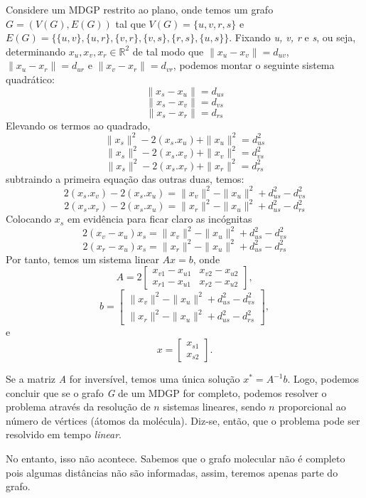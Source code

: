 \documentclass[a4paper,12pt]{article}
\begin{document}
	Considere um MDGP restrito ao plano, onde temos um grafo $G = (V(G), E(G))$ tal que $V(G)=\{u, v, r, s\}$ e $E(G)=\{\{u,v\}, \{u, r\}, \{v, r\}, \{v, s\}, \{r, s\}, \{u, s\}\}$. Fixando \textit{u, v, r} e \textit{s}, ou seja, determinando $ x_{u}, x_{v},x_{r} \in\mathbb{R}^2$ de tal modo que $\|x_{u} - x_{v}\|= d_{uv}$,  $\|x_{u} - x_{r}\|= d_{ur}$ e $\|x_{v} - x_{r}\|= d_{vr}$, podemos montar o  seguinte sistema quadrático:
	$$ \|x_{s} - x_{u}\|= d_{us} $$$$ \|x_{s} - x_{v}\|= d_{vs} $$$$ \|x_{s} - x_{r}\|= d_{rs} $$
	Elevando os termos ao quadrado,
	$$\|x_{s}\|^{2} - 2(x_{s}.x_{u}) + \|x_{u}\|^{2} = d_{us}^{2}$$
	$$\|x_{s}\|^{2} - 2(x_{s}.x_{v}) + \|x_{v}\|^{2} = d_{vs}^{2}$$
	$$\|x_{s}\|^{2} - 2(x_{s}.x_{r}) + \|x_{r}\|^{2} = d_{rs}^{2}$$
	subtraindo a primeira equação das outras duas, temos:
	$$2(x_{s}.x_{v}) - 2(x_{s}.x_{u}) = \|x_{v}\|^{2} - \|x_{u}\|^{2} + d_{us}^{2} - d_{vs}^{2}$$
	$$2(x_{s}.x_{r}) - 2(x_{s}.x_{u}) = \|x_{r}\|^{2} - \|x_{u}\|^{2} + d_{us}^{2} - d_{rs}^{2}$$
	Colocando $x_{s}$ em evidência para ficar claro as incógnitas
	$$2(x_{v} - x_{u})x_{s} = \|x_{v}\|^{2} - \|x_{u}\|^{2} + d_{us}^{2} - d_{vs}^{2}$$
	$$2(x_{r} - x_{u})x_{s} = \|x_{r}\|^{2} - \|x_{u}\|^{2} + d_{us}^{2} - d_{rs}^{2}$$
	Por tanto, temos um sistema linear $Ax = b$, onde
	$$
	A = 2\begin{bmatrix}
	x_{v1} - x_{u1} & x_{v2} - x_{u2}\\
	x_{r1} - x_{u1} & x_{r2} - x_{u2}
	\end{bmatrix},
	$$
	$$
	b = \begin{bmatrix}
	\|x_{v}\|^{2} - \|x_{u}\|^{2} + d_{us}^{2} - d_{vs}^{2}\\
	\|x_{r}\|^{2} - \|x_{u}\|^{2} + d_{us}^{2} - d_{rs}^{2}
	\end{bmatrix},
	$$
	e
	$$
	x = \begin{bmatrix}
	x_{s1}\\
	x_{s2}
	\end{bmatrix}.
	$$
	
	Se a matriz \textit{A} for inversível, temos uma única solução $x^{*} = A^{-1}b$. Logo, podemos concluir que se o grafo \textit{G} de um MDGP for completo, podemos resolver o problema através da resolução de $n$ sistemas lineares, sendo $n$ proporcional ao número de vértices (átomos da molécula). Diz-se, então, que o problema pode ser resolvido em tempo \textit{linear}.
	
	No entanto, isso não acontece. Sabemos que o grafo molecular não é completo pois algumas distâncias não são informadas, assim, teremos apenas parte do grafo. 
	
\end{document}

